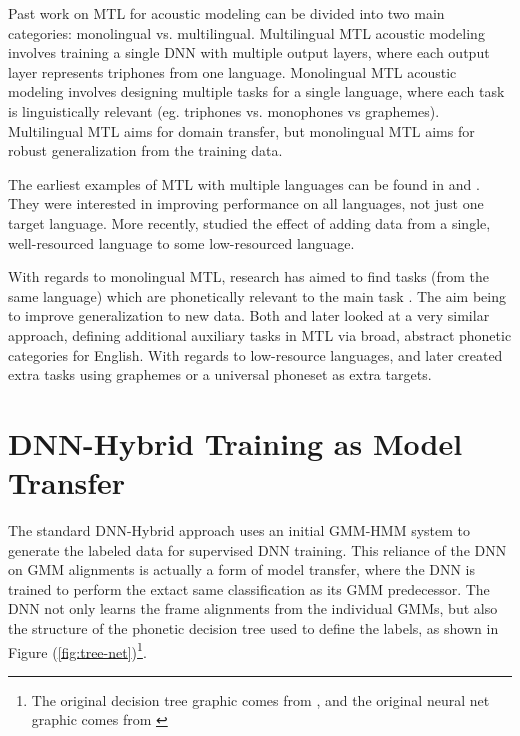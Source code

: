 \documentclass[a4paper]{article}
\begin{document}
Past work on MTL for acoustic modeling can be divided into two main categories: monolingual vs. multilingual. Multilingual MTL acoustic modeling involves training a single DNN with multiple output layers, where each output layer represents triphones from one language. Monolingual MTL acoustic modeling involves designing multiple tasks for a single language, where each task is linguistically relevant (eg. triphones vs. monophones vs graphemes). Multilingual MTL aims for domain transfer, but monolingual MTL aims for robust generalization from the training data.

The earliest examples of MTL with multiple languages can be found in \cite{huang2013} and \cite{heigold2013}. They were interested in improving performance on all languages, not just one target language. More recently, \cite{grezl2016} studied the effect of adding data from a single, well-resourced language to some low-resourced language.

With regards to monolingual MTL, research has aimed to find tasks (from the same language) which are phonetically relevant to the main task \cite{bell2015}. The aim being to improve generalization to new data. Both \cite{seltzer2013} and later \cite{huang2015} looked at a very similar approach, defining additional auxiliary tasks in MTL via broad, abstract phonetic categories for English. With regards to low-resource languages, \cite{chen2014} and later \cite{chen2015} created extra tasks using graphemes or a universal phoneset as extra targets.



\section{DNN-Hybrid Training as Model Transfer}

The standard DNN-Hybrid approach uses an initial GMM-HMM system to generate the labeled data for supervised DNN training. This reliance of the DNN on GMM alignments is actually a form of model transfer, where the DNN is trained to perform the extact same classification as its GMM predecessor. The DNN not only learns the frame alignments from the individual GMMs, but also the structure of the phonetic decision tree used to define the labels, as shown in Figure (\ref{fig:tree-net})\footnote{The original decision tree graphic comes from \cite{young2002}, and the original neural net graphic comes from \cite{heigold2013}}.
\end{document}
